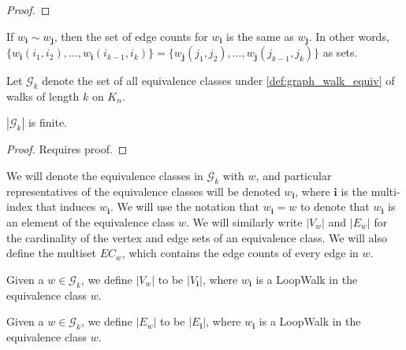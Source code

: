 \begin{proof}

\end{proof}


\begin{lemma}
  \label{lem:walk_edge_count_equiv}
  If $w_{\mathbf{i}} \sim w_{\mathbf{j}}$, then the set of edge counts for $w_{\mathbf{i}}$ is the
  same as $w_{\mathbf{j}}$. In other words,
  $\{w_{\mathbf{i}}(i_1, i_2) , \dots, w_{\mathbf{i}}(i_{k-1}, i_k)\} =
  \{w_{\mathbf{j}}(j_1, j_2) , \dots, w_{\mathbf{j}}(j_{k-1}, j_k)\}$ as sets.
\end{lemma}


\begin{definition}
  \label{def:g_k}
  Let $\mathcal{G}_k$ denote the set of all equivalence classes under \ref{def:graph_walk_equiv}
  of walks of length $k$ on $K_n$.
\end{definition}

\begin{lemma}
  \label{lem:graph_set_finite}
  $|\mathcal{G}_k|$ is finite.
\end{lemma}

\begin{proof}
  Requires proof.
\end{proof}


We will denote the equivalence classes in $\mathcal{G}_k$ with $w$, and particular representatives
of the equivalence classes will be denoted $w_{\mathbf{i}}$, where $\mathbf{i}$ is the multi-index
that induces $w_\mathbf{i}$. We will use the notation that $w_{\mathbf{i}} = w$ to denote that
$w_{\mathbf{i}}$ is an element of the equivalence class $w$. We will similarly write $|V_w|$ and
$|E_w|$ for the cardinality of the vertex and edge sets of an equivalence class. We will also define
the multiset $EC_w$, which contains the edge counts of every edge in $w$.


\begin{definition}[$|V_w|$ : ef:abs.V\_w]
  \label{def:abs.V_w}
  Given a  $w \in \mathcal{G}_k$, we define $|V_w|$ to be $|V_{\mathbf{i}}|$, where $w_{\mathbf{i}}$
  is a LoopWalk in the equivalence class $w$.
\end{definition}

\begin{definition}
  \label{def:abs.E_w}
  Given a  $w \in \mathcal{G}_k$, we define $|E_w|$ to be $|E_{\mathbf{i}}|$, where $w_{\mathbf{i}}$
  is a LoopWalk in the equivalence class $w$.
\end{definition}


